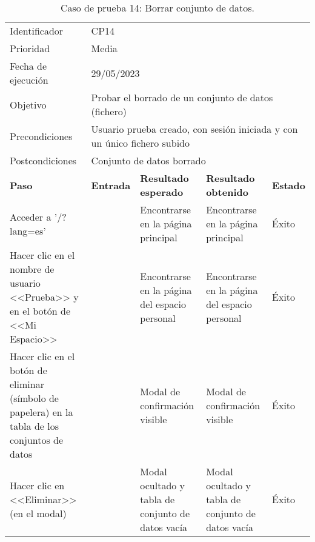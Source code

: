 \begin{table}[H]
\begin{tabular}{p{}p{}p{}p{}p{}}
\rowcolor{gray!25}
Identificador   & \multicolumn{4}{l}{CP14}                                                   \\
Prioridad   & \multicolumn{4}{l}{Media}                                                    \\
\rowcolor{gray!25}
Fecha de ejecución   & \multicolumn{4}{l}{29/05/2023}                                                    \\
Objetivo        & \multicolumn{4}{p{0.80\textwidth}}{Probar el borrado de un conjunto de datos (fichero)}                                                     \\
\rowcolor{gray!25}
Precondiciones  & \multicolumn{4}{p{0.80\textwidth}}{Usuario prueba creado, con sesión iniciada y con un único fichero subido}                                                     \\
Postcondiciones & \multicolumn{4}{l}{Conjunto de datos borrado}                                                     \\ \hline
\rowcolor{gray!25}
\textbf{Paso}   & \textbf{Entrada} & \textbf{Resultado esperado} & \textbf{Resultado obtenido} & \textbf{Estado} \\ \hline
Acceder a '/?lang=es'                                 &                        & Encontrarse en la página principal                                   & Encontrarse en la página principal                           & Éxito  \\ \hline
Hacer clic en el nombre de usuario <<Prueba>> y en el botón de <<Mi Espacio>>  &     & Encontrarse en la página del espacio personal                  & Encontrarse en la página del espacio personal                       & Éxito  \\ \hline 
Hacer clic en el botón de eliminar (símbolo de papelera) en la tabla de los conjuntos de datos &                     & Modal de confirmación visible                                     & Modal de confirmación visible                     & Éxito                            \\ \hline
Hacer clic en <<Eliminar>> (en el modal)              &                        & Modal ocultado y tabla de conjunto de datos vacía                    & Modal ocultado y tabla de conjunto de datos vacía            & Éxito                            \\ \hline
\end{tabular}
\caption{Caso de prueba 14: Borrar conjunto de datos.}
\end{table}

